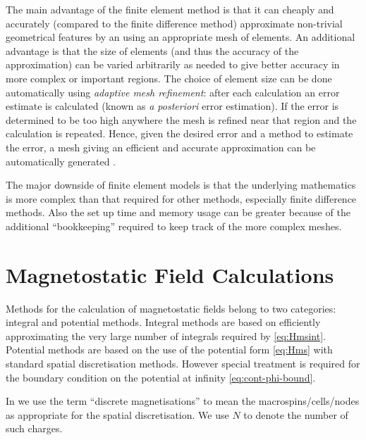 The main advantage of the finite element method is that it can cheaply and accurately (compared to the finite difference method) approximate non-trivial geometrical features by an using an appropriate mesh of elements.
An additional advantage is that the size of elements (and thus the accuracy of the approximation) can be varied arbitrarily as needed to give better accuracy in more complex or important regions.
The choice of element size can be done automatically using \emph{adaptive mesh refinement}: after each calculation an error estimate is calculated (known as \emph{a posteriori} error estimation).
If the error is determined to be too high anywhere the mesh is refined near that region and the calculation is repeated.
Hence, given the desired error and a method to estimate the error, a mesh giving an efficient and accurate approximation can be automatically generated \cite{Schrefl1999}.

The major downside of finite element models is that the underlying mathematics is more complex than that required for other methods, especially finite difference methods.
Also the set up time and memory usage can be greater because of the additional ``bookkeeping'' required to keep track of the more complex meshes.


\section{Magnetostatic Field Calculations}
\label{sec:magn-field-calc}

Methods for the calculation of magnetostatic fields belong to two categories: integral and potential methods.
Integral methods are based on efficiently approximating the very large number of integrals required by \cref{eq:Hmsint}.
Potential methods are based on the use of the potential form \cref{eq:Hms} with standard spatial discretisation methods.
However special treatment is required for the boundary condition on the potential at infinity \cref{eq:cont-phi-bound}.

In  we use the term ``discrete magnetisations'' to mean the macrospins/cells/nodes as appropriate for the spatial discretisation.
We use $N$ to denote the number of such charges.


